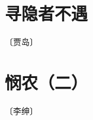 \documentclass[12pt,UTF-8,openany]{ctexbook}
\begin{document}
\vspace{8pt}


\section{寻隐者不遇}

\begin{center}
    \vspace{10pt}
    
    \begin{normalsize}
        
        〔贾岛〕
        
    \end{normalsize}
    
    \vspace{8pt}
    
    \begin{large}
        
        
        
    \end{large}
    
\end{center}

\vspace{8pt}


\section{悯农（二）}

\begin{center}
    \vspace{10pt}
    
    \begin{normalsize}
        
        〔李绅〕
        
    \end{normalsize}
    
    \vspace{8pt}
    
    \begin{large}
        
        
        
    \end{large}
    
\end{center}
\end{document}
